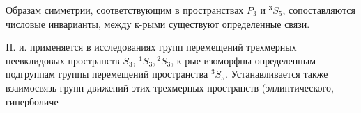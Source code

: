 \documentclass[10pt]{article}
\begin{document}
Образам симметрии, соответствующим в пространствах $P_{3}$ и ${ }^{3} S_{5}$, сопоставляются числовые инварианты, между к-рыми существуют определенные связи.



II. и. применяется в исследованиях групп перемещений трехмерных неевклидовых пространств $S_{3}$, ${ }^{1} S_{3},{ }^{2} S_{3}$, к-рые изоморфны определенным подгруппам группы перемещений пространства ${ }^{3} S_{5}$. Устанавливается также взаимосвязь групп движений этих трехмерных пространств (эллиптического, гиперболиче-
\end{document}
